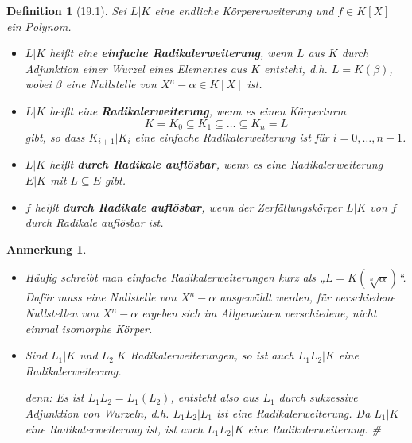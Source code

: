 \documentclass[a4paper, twoside, 11pt, ngerman]{report}
\theoremstyle{definistyle}
\newtheorem{defini}[satz]{Definition}
\newtheorem{anm}[satz]{Anmerkung}
\theoremstyle{remark}
\newenvironment{denn}%
  {\par\textit{denn:}}%
  {\hfill\#\par}
\newcommand{\defn}[1]{\textit{\bfseries #1}}
\begin{document}
\begin{defini}[19.1]
Sei $L | K$ eine endliche Körpererweiterung und $f \in K[X]$ ein Polynom.

\begin{itemize}
    \item $L | K$ heißt eine \defn{einfache Radikalerweiterung}, wenn $L$ aus $K$ durch Adjunktion einer Wurzel eines Elementes aus $K$ entsteht, d.h. $L = K(\beta)$, wobei $\beta$ eine Nullstelle von $X^n - \alpha \in K[X]$ ist.
    \item $L | K$ heißt eine \defn{Radikalerweiterung}, wenn es einen Körperturm
    \[
    K = K_0 \subseteq K_1 \subseteq \ldots \subseteq K_n = L
    \]
    gibt, so dass $K_{i+1} | K_i$ eine einfache Radikalerweiterung ist für $i = 0, \dots, n-1$.
    \item $L | K$ heißt \defn{durch Radikale auflösbar}, wenn es eine Radikalerweiterung $E | K$ mit $L \subseteq E$ gibt.
    \item $f$ heißt \defn{durch Radikale auflösbar}, wenn der Zerfällungskörper $L | K$ von $f$ durch Radikale auflösbar ist.
\end{itemize}
\end{defini}

\begin{anm}\label{anm:eig_radikalerw}
\begin{itemize}
    \item Häufig schreibt man einfache Radikalerweiterungen kurz als „$L = K(\sqrt[n]{\alpha})$“. Dafür muss eine Nullstelle von $X^n - \alpha$ ausgewählt werden, für verschiedene Nullstellen von $X^n - \alpha$ ergeben sich im Allgemeinen verschiedene, nicht einmal isomorphe Körper.
    \item Sind $L_1 | K$ und $L_2 | K$ Radikalerweiterungen, so ist auch $L_1 L_2 | K$ eine Radikalerweiterung. 
    \begin{denn}
    Es ist $L_1 L_2 = L_1(L_2)$, entsteht also aus $L_1$ durch sukzessive Adjunktion von Wurzeln, d.h. $L_1 L_2 | L_1$ ist eine Radikalerweiterung. Da $L_1|K$ eine Radikalerweiterung ist, ist auch $L_1 L_2 | K$ eine Radikalerweiterung.    
    \end{denn}
\end{itemize}
\end{anm}
\end{document}
